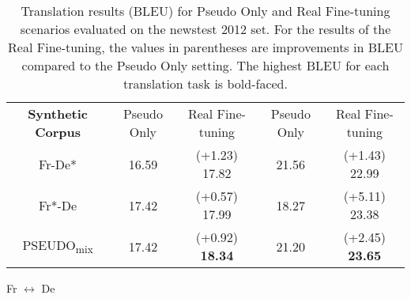 \documentclass[11pt,letterpaper]{article}
\begin{document}
\begin{table*}[t]
\begin{subtable}[t]{\columnwidth}
\begin{tabular}{c||cc||cc}
				\textbf{Synthetic Corpus} & Pseudo Only & Real Fine-tuning & Pseudo Only & Real Fine-tuning \\
                Fr-De* & 16.59 & {\scriptsize(+1.23)} 17.82 & 21.56 & {\scriptsize(+1.43)} 22.99 \\
                Fr*-De & 17.42 & {\scriptsize(+0.57)} 17.99 & 18.27 & {\scriptsize(+5.11)} 23.38 \\
                PSEUDO\textsubscript{mix} & 17.42 & {\scriptsize(+0.92)} \textbf{18.34} & 21.20 & {\scriptsize(+2.45)} \textbf{23.65} \\
            \hline
		\end{tabular}
		\label{tab:real_finetuning_frde_newstest2012}
        \caption{Fr \(\leftrightarrow\) De}
	\end{subtable}
    
\caption{Translation results (BLEU) for Pseudo Only and Real Fine-tuning scenarios evaluated on the newstest 2012 set. For the results of the Real Fine-tuning, the values in parentheses are improvements in BLEU compared to the Pseudo Only setting. The highest BLEU for each translation task is bold-faced.}
\label{tab:real_finetuning_newstest2012}
\end{table*}
\end{document}
